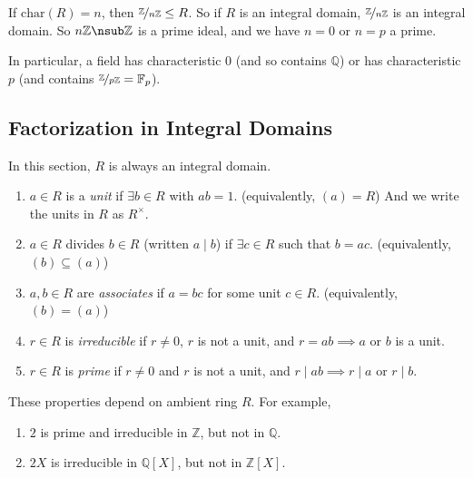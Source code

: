 \begin{remark}
    If \(\mathrm{char}(R) = n\), then \(\nicefrac{\mathbb{Z}}{n\mathbb{Z}}\leq R\). So if \(R\) is an integral domain, \(\nicefrac{\mathbb{Z}}{n\mathbb{Z}}\) is an integral domain. So \(n\mathbb{Z} \nsub \mathbb{Z}\) is a prime ideal, and we have \(n = 0\) or \(n = p\) a prime.

    In particular, a field has characteristic \(0\) (and so contains \(\mathbb{Q}\)) or has characteristic \(p\) (and contains \(\nicefrac{\mathbb{Z}}{p\mathbb{Z}} = \mathbb{F}_p\)).
\end{remark}
\subsection{Factorization in Integral Domains}
In this section, \(R\) is always an integral domain.
\begin{definition}{}{}
    \leavevmode
    \begin{enumerate}
        \item \(a \in R\) is a \textit{unit} if \(\exists b\in R\) with \(ab = 1\). (equivalently, \((a) = R\)) And we write the units in \(R\) as \(R^\times \).
        \item \(a \in R\) divides \(b \in R\) (written \(a \mid b\)) if \(\exists c \in R\) such that \(b = ac\). (equivalently, \((b) \subseteq (a)\))
        \item \(a,b \in R\) are \textit{associates}  if \(a = bc\) for some unit \(c \in R\). (equivalently, \((b) = (a)\))
        \item \(r \in R\) is \textit{irreducible} if \(r\neq 0\), \(r\) is not a unit, and \(r = ab \implies a\) or \(b\) is a unit.
        \item \(r \in R\) is \textit{prime}  if \(r \neq 0\) and \(r\) is not a unit, and \(r\mid ab \implies r \mid a\) or \(r\mid b\).
    \end{enumerate}
\end{definition}
\begin{note}
    These properties depend on ambient ring \(R\). For example,
    \begin{enumerate}
    \item \(2\) is prime and irreducible in \(\mathbb{Z}\), but not in \(\mathbb{Q}\).
    \item \(2X\) is irreducible in \(\mathbb{Q}[X]\), but not in \(\mathbb{Z}[X]\).
    \end{enumerate}
\end{note}
